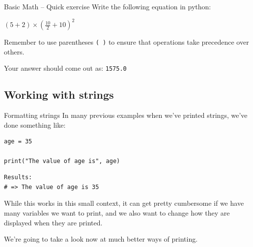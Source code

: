 \documentclass[10pt]{beamer}
\begin{document}
\begin{frame}[label={sec:orgff61c84},fragile]{Basic Math -- Quick exercise}
 Write the following equation in python:

\((5 + 2) \times (\frac{10}{2} + 10)^2\)

\alert{Remember} to use parentheses \texttt{( )} to ensure that operations take precedence over
others.

Your answer should come out as: \texttt{1575.0}
\end{frame}

\subsection{Working with strings}
\label{sec:org8eca5c9}

\begin{frame}[label={sec:org2f8dddd},fragile]{Formatting strings}
 In many previous examples when we've printed strings, we've done something like:

\begin{verbatim}
age = 35

print("The value of age is", age)
\end{verbatim}

\begin{verbatim}
Results: 
# => The value of age is 35
\end{verbatim}


While this works in this small context, it can get pretty cumbersome if we have many
variables we want to print, and we also want to change how they are displayed when
they are printed.

We're going to take a look now at much better ways of printing.
\end{frame}
\end{document}
